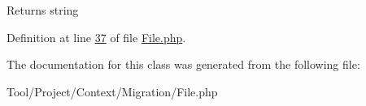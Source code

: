 \begin{DoxyReturn}{Returns}
string 
\end{DoxyReturn}


Definition at line \hyperlink{Migration_2File_8php_source_l00037}{37} of file \hyperlink{Migration_2File_8php_source}{File.\-php}.



The documentation for this class was generated from the following file\-:\begin{DoxyCompactItemize}
\item 
Tool/\-Project/\-Context/\-Migration/File.\-php\end{DoxyCompactItemize}
